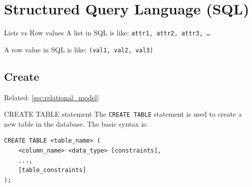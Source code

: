 \section{Structured Query Language (SQL)}

\begin{knBox}
    {Lists vs Row values}
    A list in SQL is like: \texttt{attr1, attr2, attr3, \ldots}

    A row value in SQL is like: \texttt{(val1, val2, val3)}
\end{knBox}

\label{sec:sql_create}
\subsection{Create}

Related: \ref{sec:relational_model}

\begin{definition}
    {CREATE TABLE statement}
    The \texttt{CREATE TABLE} statement is used to create a new table in the database. The basic syntax is:

    \begin{verbatim}
CREATE TABLE <table_name> (
    <column_name> <data_type> [constraints],
    ...,
    [table_constraints]
);
    \end{verbatim}
\end{definition}

